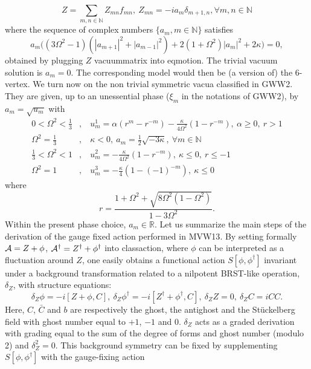 \documentclass[10pt]{book}
\theoremstyle{break}
\begin{document}
\begin{equation}
Z=\sum_{m,n\in\mathbb{N}}Z_{mn}f_{mn},\ Z_{mn}=-ia_{m}\delta_{m+1,n}, \forall m,n\in\mathbb{N}
\end{equation}
where  the sequence of complex numbers $\{a_m, m\in\mathbb{N}\}$ satisfies
\begin{equation}
a_m\bigg((3\Omega^2-1)(|a_{m+1}|^2+|a_{m-1}|^2)+2(1+\Omega^2)|a_m|^2+2\kappa  \bigg)=0,
\end{equation}
obtained by plugging $Z$ {vacuummatrix} into {eqmotion}. The trivial vacuum solution is $a_m=0$. The corresponding model would then be (a version of) the 6-vertex. We turn now on the non trivial symmetric vacua classified in {GWW2}. They are given, up to an unessential phase ($\xi_m$ in the notations of {GWW2}), by $a_m=\sqrt{u_m}$ with
\begin{eqnarray}
0<\Omega^2<\frac{1}{3}&,&\ u^1_m=\alpha(r^m-r^{-m})-\frac{\kappa}{4\Omega^2}(1-r^{-m}),\ \alpha\ge0,\ r>1\\
\Omega^2={\frac{1}{3}}&,&\ \kappa<0,\ a_m={\frac12}{\sqrt{ -3\kappa}},\ \forall m\in\mathbb{N}\\
\frac{1}{3}<\Omega^2<1&,&\ u^2_m=-\frac{\kappa}{4\Omega^2}(1-r^{-m}),\ \kappa\le0,\ r\le-1\\
\Omega^2=1&,&\ u^3_m=-\frac{\kappa}{4}(1-(-1)^{-m}),\ \kappa\le0
\end{eqnarray}
where
\begin{equation}
r=\frac{1+\Omega^2+\sqrt{8\Omega^2(1-\Omega^2)}}{1-3\Omega^2}.
\end{equation}
Within the present phase choice, $a_m\in\mathbb{R}$. Let us summarize the main steps of the derivation of the gauge fixed action performed in {MVW13}. By setting formally ${\cal{A}}=Z+\phi$, ${\cal{A}}^\dag=Z^\dag+\phi^\dag$ into {classaction}, where $\phi$ can be interpreted as a fluctuation around $Z$, one easily obtains a functional action $S[\phi,\phi^\dag]$ invariant under a background transformation related to a nilpotent BRST-like operation, $\delta_Z$, with structure equations:
\begin{equation}
\delta_Z\phi=-i[Z+\phi,C],\ \delta_Z\phi^\dag=-i[Z^\dag+\phi^\dag,C],\ \delta_ZZ=0,\ \delta_ZC=iCC.
\end{equation}
Here, $C$, ${\bar{C}}$ and $b$ are respectively the ghost, the antighost and the St\"uckelberg field with ghost number equal to $+1$, $-1$ and $0$. $\delta_Z$ acts as a graded derivation with grading equal to the sum of the degree of forms and ghost number (modulo 2) and $\delta_Z^2=0$. This background symmetry can be fixed by supplementing $S[\phi,\phi^\dag]$ with the gauge-fixing action
\end{document}
